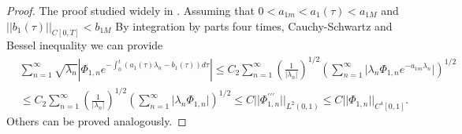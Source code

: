 \documentclass[preprint,12pt,authoryear]{elsarticle}
\begin{document}
\begin{proof}
    The proof studied widely in \cite{20}. Assuming that $0<a_{1m}<a_1(\tau)<a_{1M}$ and $||b_1(\tau)||_{C[0,T]}<b_{1M}$ By integration by parts four times, Cauchy-Schwartz and Bessel inequality we can provide
    \begin{equation*}
        \begin{split}
            &\sum_{n=1}^{\infty}\sqrt{\lambda_n}|\Phi_{1,n}e^{-\int_0^t(a_1(\tau)\lambda_{n}-b_1(\tau))d\tau}|\leq C_2\sum_{n=1}^{\infty}\left(\frac{1}{|\lambda_n|}\right)^{1/2}\left(\sum_{n=1}^{\infty}\bigg|\lambda_n\Phi_{1,n}e^{-a_{1m}\lambda_n}\bigg|\right)^{1/2}\\
            &\leq C_2\sum_{n=1}^{\infty}\left(\frac{1}{|\lambda_n|}\right)^{1/2}\left(\sum_{n=1}^{\infty}\bigg|\lambda_n\Phi_{1,n}\bigg|\right)^{1/2}\leq C||\Phi_{1,n}^{\prime\prime\prime}||_{L^2(0,1)}\leq C||\Phi_{1,n}||_{C^4[0,1]}.
        \end{split}
    \end{equation*}
    Others can be proved analogously.
\end{proof}
\end{document}
